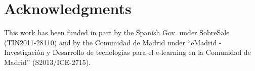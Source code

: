 \documentclass[a4paper]{article}
\begin{document}
\section*{Acknowledgments}

This work has been funded in part by the Spanish Gov. under SobreSale (TIN2011-28110) and by the Comunidad de Madrid under ``eMadrid - Investigaci\'on y Desarrollo de tecnolog\'ias para el e-learning en la Comunidad de Madrid'' (S2013/ICE-2715).

 


%
%
%
\end{document}
